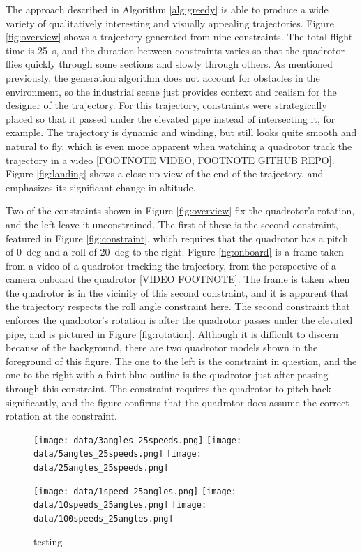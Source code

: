 \documentclass[pageno]{jpaper}
\begin{document}
The approach described in Algorithm \ref{alg:greedy} is able to produce a wide variety of qualitatively interesting and visually appealing trajectories. Figure \ref{fig:overview} shows a trajectory generated from nine constraints. The total flight time is \qty{25}{s}, and the duration between constraints varies so that the quadrotor flies quickly through some sections and slowly through others. As mentioned previously, the generation algorithm does not account for obstacles in the environment, so the industrial scene just provides context and realism for the designer of the trajectory. For this trajectory, constraints were strategically placed so that it passed under the elevated pipe instead of intersecting it, for example. The trajectory is dynamic and winding, but still looks quite smooth and natural to fly, which is even more apparent when watching a quadrotor track the trajectory in a video [FOOTNOTE VIDEO, FOOTNOTE GITHUB REPO]. Figure \ref{fig:landing} shows a close up view of the end of the trajectory, and emphasizes its significant change in altitude.

Two of the constraints shown in Figure \ref{fig:overview} fix the quadrotor's rotation, and the left leave it unconstrained. The first of these is the second constraint, featured in Figure \ref{fig:constraint}, which requires that the quadrotor has a pitch of \qty{0}{deg} and a roll of \qty{20}{deg} to the right. Figure \ref{fig:onboard} is a frame taken from a video of a quadrotor tracking the trajectory, from the perspective of a camera onboard the quadrotor [VIDEO FOOTNOTE]. The frame is taken when the quadrotor is in the vicinity of this second constraint, and it is apparent that the trajectory respects the roll angle constraint here. The second constraint that enforces the quadrotor's rotation is after the quadrotor passes under the elevated pipe, and is pictured in Figure \ref{fig:rotation}. Although it is difficult to discern because of the background, there are two quadrotor models shown in the foreground of this figure. The one to the left is the constraint in question, and the one to the right with a faint blue outline is the quadrotor just after passing through this constraint. The constraint requires the quadrotor to pitch back significantly, and the figure confirms that the quadrotor does assume the correct rotation at the constraint.

\begin{figure}[htbb]
  \begin{minipage}[b]{0.5\linewidth}
    \texttt{[image: data/3angles\_25speeds.png]}
    \texttt{[image: data/5angles\_25speeds.png]}
    \texttt{[image: data/25angles\_25speeds.png]}
  \end{minipage}
  \begin{minipage}[b]{0.5\linewidth}
    \texttt{[image: data/1speed\_25angles.png]}
    \texttt{[image: data/10speeds\_25angles.png]}
    \texttt{[image: data/100speeds\_25angles.png]}
  \end{minipage}
  \caption{testing}
  \label{fig:greedy}
\end{figure}
\end{document}
